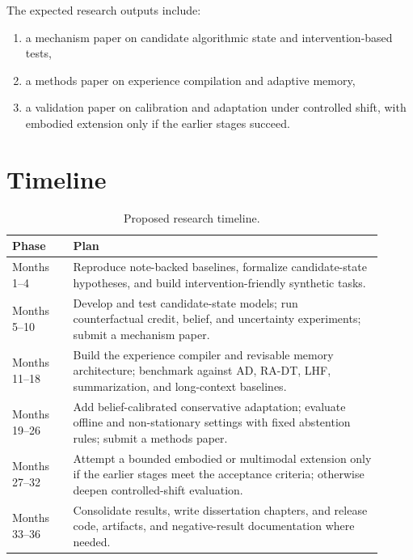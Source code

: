 \documentclass[10pt,twocolumn,letterpaper]{article}
\begin{document}
The expected research outputs include:
\begin{enumerate}[leftmargin=1.3em]
\item a mechanism paper on candidate algorithmic state and intervention-based tests,
\item a methods paper on experience compilation and adaptive memory,
\item a validation paper on calibration and adaptation under controlled shift, with embodied extension only if the earlier stages succeed.
\end{enumerate}

\section{Timeline}
\begin{table}[h]
\centering
\small
\begin{tabular}{p{0.15\linewidth}p{0.76\linewidth}}
\toprule
\textbf{Phase} & \textbf{Plan} \\
\midrule
Months 1--4 & Reproduce note-backed baselines, formalize candidate-state hypotheses, and build intervention-friendly synthetic tasks. \\
Months 5--10 & Develop and test candidate-state models; run counterfactual credit, belief, and uncertainty experiments; submit a mechanism paper. \\
Months 11--18 & Build the experience compiler and revisable memory architecture; benchmark against AD, RA-DT, LHF, summarization, and long-context baselines. \\
Months 19--26 & Add belief-calibrated conservative adaptation; evaluate offline and non-stationary settings with fixed abstention rules; submit a methods paper. \\
Months 27--32 & Attempt a bounded embodied or multimodal extension only if the earlier stages meet the acceptance criteria; otherwise deepen controlled-shift evaluation. \\
Months 33--36 & Consolidate results, write dissertation chapters, and release code, artifacts, and negative-result documentation where needed. \\
\bottomrule
\end{tabular}
\caption{Proposed research timeline.}
\end{table}



\end{document}
